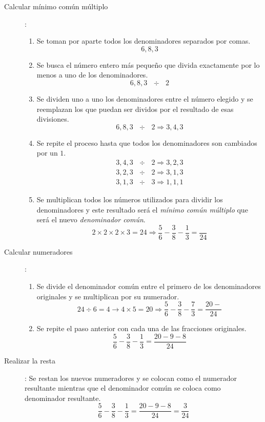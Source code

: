 \begin{description}
\item[Calcular mínimo común múltiplo]:
\begin{enumerate}
\item Se toman por aparte todos los denominadores separados por comas.
\begin{equation*}
6, 8, 3
\end{equation*}
\item Se busca el número entero más pequeño que divida exactamente por lo menos a uno de los denominadores.
\begin{equation*}
6, 8, 3 \text{ } \div \text{ }2
\end{equation*}
\item Se dividen uno a uno los denominadores entre el número elegido y se reemplazan los que puedan ser dividos por el resultado de esas divisiones.
\begin{equation*}
6, 8, 3 \text{ }\div\text{ }2 \Rightarrow 3, 4, 3
\end{equation*}
\item Se repite el proceso hasta que todos los denominadores son cambiados por un $1$.
\begin{eqnarray*}
3, 4, 3 \text{ }\div\text{ }2 \Rightarrow 3, 2, 3\\
3, 2, 3 \text{ }\div\text{ }2 \Rightarrow 3, 1, 3\\
3, 1, 3 \text{ }\div\text{ }3 \Rightarrow 1, 1, 1
\end{eqnarray*}
\item Se multiplican todos los números utilizados para dividir los denominadores y este resultado será el \emph{mínimo común múltiplo} que será el nuevo \emph{denominador común}.
\begin{equation*}
2 \times 2 \times 2 \times 3 = 24 \Rightarrow \dfrac{5}{6}-\dfrac{3}{8}-\dfrac{1}{3}=\dfrac{}{24}
\end{equation*}
\end{enumerate}
\item[Calcular numeradores]:
\begin{enumerate}
\item Se divide el denominador común entre el primero de los denominadores originales y se multiplican por su numerador.
\begin{equation*}
24 \div 6 = 4 \rightarrow 4\times 5 = 20 \Rightarrow \dfrac{5}{6}-\dfrac{3}{8}-\dfrac{7}{3}=\dfrac{20-}{24}
\end{equation*}
\item Se repite el paso anterior con cada una de las fracciones originales.
\begin{equation*}
\dfrac{5}{6}-\dfrac{3}{8}-\dfrac{1}{3}=\dfrac{20-9-8}{24}
\end{equation*}
\end{enumerate}
\item[Realizar la resta]: Se restan los nuevos numeradores y se colocan como el numerador resultante mientras que el denominador común se coloca como denominador resultante.
\begin{equation*}
\dfrac{5}{6}-\dfrac{3}{8}-\dfrac{1}{3}=\dfrac{20-9-8}{24}=\dfrac{3}{24}
\end{equation*}
\end{description}

